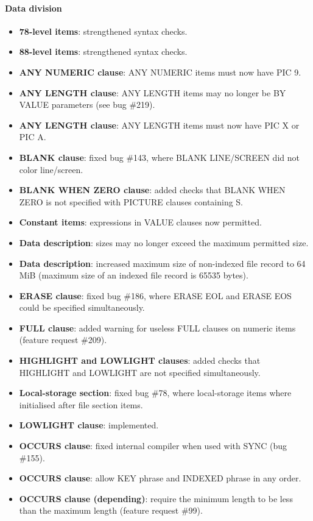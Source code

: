 \paragraph{Data division}
\begin{itemize}
\item \textbf{78-level items}: strengthened syntax checks.
\item \textbf{88-level items}: strengthened syntax checks.
\item \textbf{ANY NUMERIC clause}: ANY NUMERIC items must now have PIC 9.
\item \textbf{ANY LENGTH clause}: ANY LENGTH items may no longer be BY VALUE parameters (see bug \#219).
\item \textbf{ANY LENGTH clause}: ANY LENGTH items must now have PIC X or PIC A.
\item \textbf{BLANK clause}: fixed bug \#143, where BLANK LINE\slash{}SCREEN did not color line\slash{}screen.
\item \textbf{BLANK WHEN ZERO clause}: added checks that BLANK WHEN ZERO is not specified with PICTURE clauses containing S.
\item \textbf{Constant items}: expressions in VALUE clauses now permitted.
\item \textbf{Data description}: sizes may no longer exceed the maximum permitted size.
\item \textbf{Data description}: increased maximum size of non-indexed file record to 64 MiB (maximum size of an indexed file record is 65535 bytes).
\item \textbf{ERASE clause}: fixed bug \#186, where ERASE EOL and ERASE EOS could be specified simultaneously.
\item \textbf{FULL clause}: added warning for useless FULL clauses on numeric items (feature request \#209).
\item \textbf{HIGHLIGHT and LOWLIGHT clauses}: added checks that HIGHLIGHT and LOWLIGHT are not specified simultaneously.
\item \textbf{Local-storage section}: fixed bug \#78, where local-storage items where initialised after file section items.
\item \textbf{LOWLIGHT clause}: implemented.
\item \textbf{OCCURS clause}: fixed internal compiler when used with SYNC (bug \#155).
\item \textbf{OCCURS clause}: allow KEY phrase and INDEXED phrase in any order.
\item \textbf{OCCURS clause (depending)}: require the minimum length to be less than the maximum length (feature request \#99).

\end{itemize}
